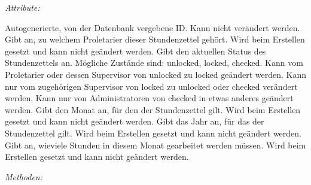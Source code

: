 \begin{itemize}
                \emph{Attribute:}
                \begin{itemize}
                        Autogenerierte, von der Datenbank vergebene ID.
                        Kann nicht verändert werden.
                        Gibt an, zu welchem Proletarier dieser Stundenzettel gehört.
                        Wird beim Erstellen gesetzt und kann nicht geändert werden.
                        Gibt den aktuellen Status des Stundenzettels an.
                        Mögliche Zustände sind: unlocked, locked, checked.
                        Kann vom Proletarier oder dessen Supervisor von unlocked zu locked geändert werden.
                        Kann nur vom zugehörigen Supervisor von locked zu unlocked oder checked verändert werden.
                        Kann nur von Administratoren von checked in etwas anderes geändert werden.
                        Gibt den Monat an, für den der Stundenzettel gilt.
                        Wird beim Erstellen gesetzt und kann nicht geändert werden.
                        Gibt das Jahr an, für das der Stundenzettel gilt.
                        Wird beim Erstellen gesetzt und kann nicht geändert werden.
                        Gibt an, wieviele Stunden in diesem Monat gearbeitet werden müssen.
                        Wird beim Erstellen gesetzt und kann nicht geändert werden.
                \end{itemize}
                \emph{Methoden:}
                \begin{itemize}
                \end{itemize}


\end{itemize}
